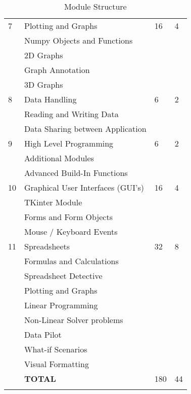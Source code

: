 \begin{longtable}{|p{1.4cm}|p{8.4cm}|p{2.2cm}|p{1.8cm}|}
             \hline
             7  & Plotting and Graphs                        & 16 & 4  \\
                & \qquad Numpy Objects and Functions         &    &    \\
                & \qquad 2D Graphs                           &    &    \\
                & \qquad Graph Annotation                    &    &    \\
                & \qquad 3D Graphs                           &    &    \\
             \hline
             8  & Data Handling                              &  6 & 2  \\
                & \qquad Reading and Writing Data            &    &    \\
                & \qquad Data Sharing between Application    &    &    \\
             \hline
             9  & High Level Programming                     &  6 & 2  \\
                & \qquad Additional Modules                  &    &    \\
                & \qquad Advanced Build-In Functions         &    &    \\
             \hline
             10 & Graphical User Interfaces (GUI's)          & 16 & 4  \\
                & \qquad TKinter Module                      &    &    \\
                & \qquad Forms and Form Objects              &    &    \\
                & \qquad Mouse / Keyboard Events             &    &    \\
             \hline
             11 & Spreadsheets                               & 32 & 8  \\
                & \qquad Formulas and Calculations           &    &    \\
                & \qquad Spreadsheet Detective               &    &    \\
                & \qquad Plotting and Graphs                 &    &    \\
                & \qquad Linear Programming                  &    &    \\
                & \qquad Non-Linear Solver problems          &    &    \\
                & \qquad Data Pilot                          &    &    \\
                & \qquad What-if Scenarios                   &    &    \\
                & \qquad Visual Formatting                   &    &    \\
             \hline
                & {\bf TOTAL}                                &180 &44  \\
             \hline

             \caption[Module Structure]{Module Structure} \label{tab:study_comp} \\
        \end{longtable}

